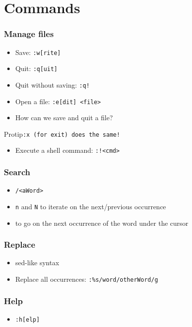 \documentclass{beamer}
\begin{document}
\section{Commands}
\begin{frame} \frametitle{Manage files}
  \begin{itemize}
    \item Save: {\tt :w[rite]}
    \item Quit: {\tt :q[uit]}
    \item Quit without saving: {\tt :q!}
    \item Open a file: {\tt :e[dit] <file>}
  \end{itemize}
\end{frame}
\begin{frame}
  \begin{itemize}
    \item How can we save and quit a file? 
  \end{itemize}
  \pause
  \begin{exampleblock}{Protip}{\tt :x (for exit) does the same!}\end{exampleblock}
\end{frame}
\begin{frame}
  \begin{itemize}
    \item Execute a shell command: {\tt :!<cmd>}
  \end{itemize}
\end{frame}
\begin{frame} \frametitle{Search}
  \begin{itemize}
    \item {\tt /<aWord>}
    \item {\tt n} and {\tt N} to iterate on the next/previous occurrence
  \end{itemize}
  \begin{itemize}
    \item {\tt *} to go on the next occurrence of the word under the cursor
  \end{itemize}
\end{frame}
\begin{frame} \frametitle{Replace}
  \begin{itemize}
    \item sed-like syntax
    \item Replace all occurrences: {\tt :\%s/word/otherWord/g}
  \end{itemize}
\end{frame}
\begin{frame} \frametitle{Help}
  \begin{itemize}
    \item {\tt :h[elp]}
  \end{itemize}
\end{frame}
\end{document}
